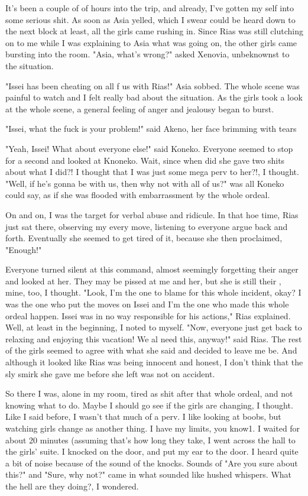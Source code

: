 \documentclass{article}
\begin{document}
It's been a couple of of hours into the trip, and already, I've gotten my self into some serious shit. As soon as Asia yelled, which I swear could be heard down to the next block at least, all the girls came rushing in. Since Rias was still clutching on to me while I was explaining to Asia what was going on, the other girls came bursting into the room. "Asia, what's wrong?" asked Xenovia, unbeknownst to the situation.

"Issei has been cheating on all f us with Rias!" Asia sobbed. The whole scene was painful to watch and I felt really bad about the situation. As the girls took a look at the whole scene, a general feeling of anger and jealousy began to burst.

"Issei, what the fuck is your problem!" said Akeno, her face brimming with tears

"Yeah, Issei! What about everyone else!" said Koneko. Everyone seemed to stop for a second and looked at Knoneko. Wait, since when did she gave two shits about what I did?! I thought that I was just some mega perv to her?!, I thought. "Well, if he's gonna be with us, then why not with all of us?" was all Koneko could say, as if she was flooded with embarrassment by the whole ordeal.

On and on, I was the target for verbal abuse and ridicule. In that hoe time, Rias just sat there, observing my every move, listening to everyone argue back and forth. Eventually she seemed to get tired of it, because she then proclaimed, "Enough!"

Everyone turned silent at this command, almost seemingly forgetting their anger and looked at her. They may be pissed at me and her, but she is still their , mine, too, I thought. "Look, I'm the one to blame for this whole incident, okay? I was the one who put the moves on Issei and I'm the one who made this whole ordeal happen. Issei was in no way responsible for his actions," Rias explained. Well, at least in the beginning, I noted to myself. "Now, everyone just get back to relaxing and enjoying this vacation! We al need this, anyway!" said Rias. The rest of the girls seemed to agree with what she said and decided to leave me be. And although it looked like Rias was being innocent and honest, I don't think that the sly smirk she gave me before she left was not on accident.

So there I was, alone in my room, tired as shit after that whole ordeal, and not knowing what to do. Maybe I should go see if the girls are changing, I thought. Like I said before, I wasn't that much of a perv. I like looking at boobs, but watching girls change as another thing. I have my limits, you know1. I waited for about 20 minutes (assuming that's how long they take, I went across the hall to the girls' suite. I knocked on the door, and put my ear to the door. I heard quite a bit of noise because of the sound of the knocks. Sounds of "Are you sure about this?" and "Sure, why not?" came in what sounded like hushed whispers. What the hell are they doing?, I wondered.
\end{document}
